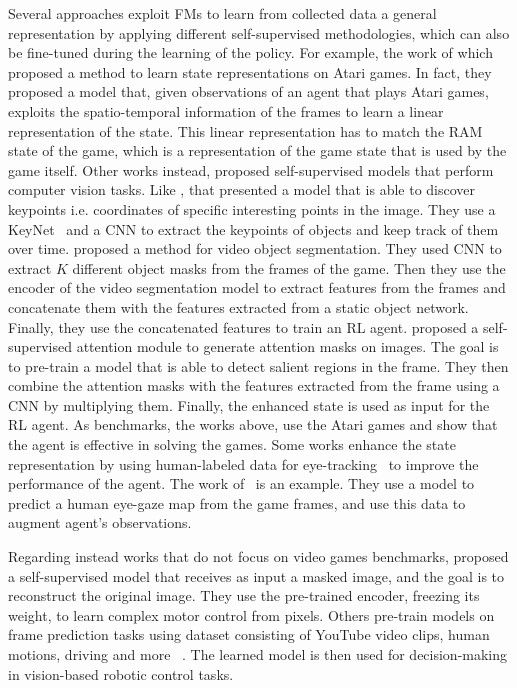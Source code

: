 Several approaches exploit FMs to learn from collected data a general representation by applying different self-supervised methodologies, which can also be fine-tuned during the learning of the policy.
For example, the work of \citet{anand2019unsupervised} which proposed a method to learn state representations on Atari games.
In fact, they proposed a model that, given observations of an agent that plays Atari games, exploits the spatio-temporal information of the frames to learn a linear representation of the state.
This linear representation has to match the RAM state of the game, which is a representation of the game state that is used by the game itself.
Other works instead, proposed self-supervised models that perform computer vision tasks.
Like \citet{kulkarni2019unsupervised}, that presented a model that is able to discover keypoints i.e. coordinates of specific interesting points in the image.
They use a KeyNet~\citep{jakab2018keynet} and a CNN to extract the keypoints of objects and keep track of them over time.
\citet{goel2018unsupervised} proposed a method for video object segmentation.
They used CNN to extract $K$ different object masks from the frames of the game.
Then they use the encoder of the video segmentation model to extract features from the frames and concatenate them with
the features extracted from a static object network.
Finally, they use the concatenated features to train an RL agent.
\citet{wu2021self} proposed a self-supervised attention module to generate attention masks on images.
The goal is to pre-train a model that is able to detect salient regions in the frame.
They then combine the attention masks with the features extracted from the frame using a CNN by multiplying them.
Finally, the enhanced state is used as input for the RL agent.
As benchmarks, the works above, use the Atari games and show that the agent is effective in solving the games.
Some works enhance the state representation by using human-labeled data for eye-tracking~\citep{zhang2020atari} to improve the performance of the agent.
The work of~\citet{thammineni2023selective} is an example.
They use a model to predict a human eye-gaze map from the game frames, and use this data to augment agent's observations.

Regarding instead works that do not focus on video games benchmarks, \citet{xiao2022masked} proposed a self-supervised model that receives as input a masked image, and the goal is to reconstruct the original image.
They use the pre-trained encoder, freezing its weight, to learn complex motor control from pixels.
Others pre-train models on frame prediction tasks using dataset consisting of YouTube video clips, human motions, driving and more ~\citep{finn2016unsupervised}.
The learned model is then used for decision-making in vision-based robotic control tasks.



